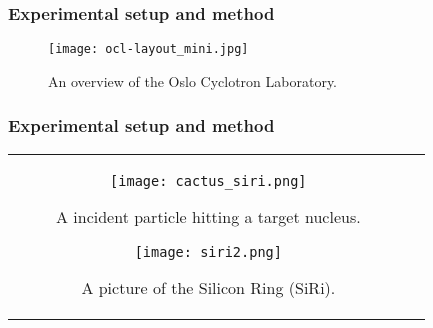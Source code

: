 \documentclass{beamer}              %
\begin{document}

\begin{frame}
\frametitle{Experimental setup and method}

\begin{figure}[htp]
\centering
\texttt{[image: ocl-layout\_mini.jpg]}
\caption{An overview of the Oslo Cyclotron Laboratory.}%
\label{fig:OLC_exp_hall}
\end{figure}
\end{frame}

\begin{frame}
\frametitle{Experimental setup and method}

\begin{tabular}{cc}

\begin{minipage}{0.5\textwidth}
\begin{figure}[htp]
\centering
\texttt{[image: cactus\_siri.png]}
\caption{A incident particle hitting a target nucleus.}%
\label{fig: cactus_siri}
\end{figure}
\end{minipage}

\begin{minipage}{0.5\textwidth}
\begin{figure}[htp]
\centering
\texttt{[image: siri2.png]}
\caption{A picture of the Silicon Ring (SiRi).}
\label{fig: siri}
\end{figure}
\end{minipage}

\end{tabular}
\end{frame}
\end{document}
